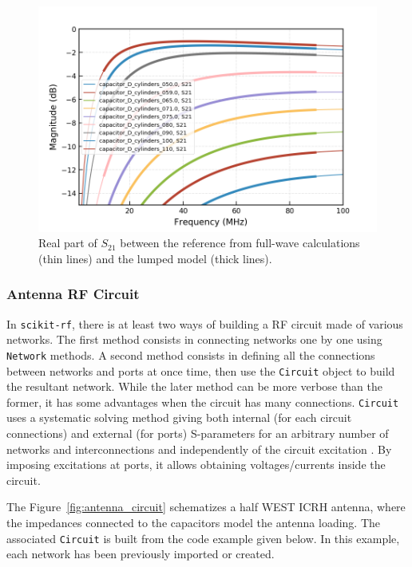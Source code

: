 {\begin{figure}
	\centering
	\includegraphics[width=1.0\linewidth]{figures/chap3/WEST_ICRH/comparison_fullwave_lumped_S21}
	\caption{Real part of $S_{21}$ between the reference from full-wave  calculations (thin lines) and the lumped model (thick lines).}
	\label{fig:capacitor_interpolation_S21}
\end{figure}

\clearpage
\subsubsection{Antenna RF Circuit}
In \texttt{scikit-rf}, there is at least two ways of building a RF circuit made of various networks. The first method consists in connecting networks one by one using \texttt{Network} methods. A second method consists in defining all the connections between networks and ports at once time, then use the \texttt{Circuit} object to build the resultant network. While the later method can be more verbose than the former, it has some advantages when the circuit has many connections. \texttt{Circuit} uses a systematic solving method giving both internal (for each circuit connections) and external (for ports) S-parameters for an arbitrary number of networks and interconnections and independently of the circuit excitation . By imposing excitations at ports, it allows obtaining voltages/currents inside the circuit.

The Figure~\ref{fig:antenna_circuit} schematizes a half WEST ICRH antenna, where the impedances connected to the capacitors model the antenna loading. The associated \texttt{Circuit} is built from the code example given below. In this example, each network has been previously imported or created. 

}
